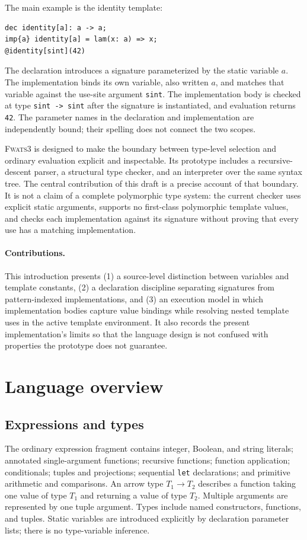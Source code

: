\documentclass[11pt]{article}
\newcommand{\FWATS}{\textsc{Fwats3}}
\begin{document}
The main example is the identity template:
\begin{lstlisting}
dec identity[a]: a -> a;
imp{a} identity[a] = lam(x: a) => x;
@identity[sint](42)
\end{lstlisting}
The declaration introduces a signature parameterized by the static variable
\(a\). The implementation binds its own variable, also written \(a\), and
matches that variable against the use-site argument \texttt{sint}. The
implementation body is checked at type \texttt{sint -> sint} after the
signature is instantiated, and evaluation returns \texttt{42}. The parameter
names in the declaration and implementation are independently bound; their
spelling does not connect the two scopes.

\FWATS{} is designed to make the boundary between type-level selection and
ordinary evaluation explicit and inspectable. Its prototype includes a
recursive-descent parser, a structural type checker, and an interpreter over
the same syntax tree. The central contribution of this draft is a precise
account of that boundary. It is not a claim of a complete polymorphic type
system: the current checker uses explicit static arguments, supports no
first-class polymorphic template values, and checks each implementation
against its signature without proving that every use has a matching
implementation.

\paragraph{Contributions.}
This introduction presents (1) a source-level distinction between variables
and template constants, (2) a declaration discipline separating signatures
from pattern-indexed implementations, and (3) an execution model in which
implementation bodies capture value bindings while resolving nested template
uses in the active template environment. It also records the present
implementation's limits so that the language design is not confused with
properties the prototype does not guarantee.

\section{Language overview}

\subsection{Expressions and types}

The ordinary expression fragment contains integer, Boolean, and string
literals; annotated single-argument functions; recursive functions; function
application; conditionals; tuples and projections; sequential \texttt{let}
declarations; and primitive arithmetic and comparisons. An arrow type
\(T_1 \to T_2\) describes a function taking one value of type \(T_1\) and
returning a value of type \(T_2\). Multiple arguments are represented by one
tuple argument. Types include named constructors, functions, and tuples. Static
variables are introduced explicitly by declaration parameter lists; there is
no type-variable inference.
\end{document}
